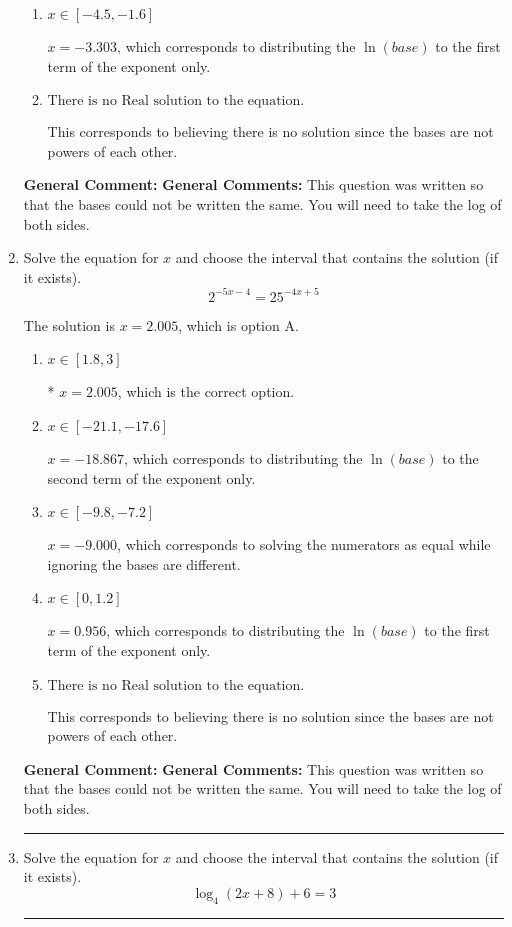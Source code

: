 \documentclass{extbook}[14pt]
\newcommand{\litem}[1]{\item #1

\rule{\textwidth}{0.4pt}}
\begin{document}
\begin{enumerate}
{\begin{enumerate}[label=\Alph*.]
$x = 1.125$, which corresponds to solving the numerators as equal while ignoring the bases are different.
\item \( x \in [-4.5, -1.6] \)

$x = -3.303$, which corresponds to distributing the $\ln(base)$ to the first term of the exponent only.
\item \( \text{There is no Real solution to the equation.} \)

This corresponds to believing there is no solution since the bases are not powers of each other.
\end{enumerate}

\textbf{General Comment:} \textbf{General Comments:} This question was written so that the bases could not be written the same. You will need to take the log of both sides.
}
\litem{
Solve the equation for $x$ and choose the interval that contains the solution (if it exists).
\[ 2^{-5x-4} = 25^{-4x+5} \]

The solution is \( x = 2.005 \), which is option A.\begin{enumerate}[label=\Alph*.]
\item \( x \in [1.8, 3] \)

* $x = 2.005$, which is the correct option.
\item \( x \in [-21.1, -17.6] \)

$x = -18.867$, which corresponds to distributing the $\ln(base)$ to the second term of the exponent only.
\item \( x \in [-9.8, -7.2] \)

$x = -9.000$, which corresponds to solving the numerators as equal while ignoring the bases are different.
\item \( x \in [0, 1.2] \)

$x = 0.956$, which corresponds to distributing the $\ln(base)$ to the first term of the exponent only.
\item \( \text{There is no Real solution to the equation.} \)

This corresponds to believing there is no solution since the bases are not powers of each other.
\end{enumerate}

\textbf{General Comment:} \textbf{General Comments:} This question was written so that the bases could not be written the same. You will need to take the log of both sides.
}
\litem{
Solve the equation for $x$ and choose the interval that contains the solution (if it exists).
\[ \log_{4}{(2x+8)}+6 = 3 \]

}
\end{enumerate}
\end{document}
